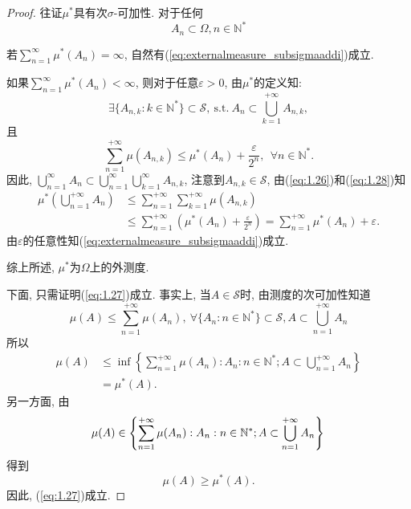 \begin{proof}
	往证$\mu^*$具有次$\sigma$-可加性. 对于任何\begin{equation}
		A_n\subset\Omega,n\in\mathbb{N}^*
	\end{equation}
	\begin{blist}
		\item 若$\sum_{n=1}^{\infty}\mu^*(A_n) = \infty$, 自然有(\ref{eq:externalmeasure_subsigmaaddi})成立.
		\item 如果$\sum_{n=1}^{\infty}\mu^*(A_n) < \infty$, 则对于任意$\varepsilon>0$, 由$\mu^*$的定义知:
		\begin{equation}
			\exists\{A_{n,k}:k\in\mathbb{N}^*\}\subset\mathscr{S},~\mathrm{s.t.}~A_n\subset\bigcup_{k=1}^{+\infty}A_{n,k},
		\end{equation}
		且\begin{equation}\label{eq:1.28}
			\sum_{n=1}^{+\infty}\mu(A_{n,k})\leqslant \mu^*(A_n) + \frac{\varepsilon}{2^n},~~\forall n\in\mathbb{N}^*.
		\end{equation}
		因此, $\bigcup_{n=1}^{\infty}A_n\subset\bigcup_{n=1}^{\infty}\bigcup_{k=1}^{\infty}A_{n,k}$, 注意到$A_{n,k}\in\mathscr{S}$, 由(\ref{eq:1.26})和(\ref{eq:1.28})知
		\begin{align}
			\mu^*\left( \bigcup_{n=1}^{+\infty}A_n \right)&\leqslant \sum_{n=1}^{+\infty}\sum_{k=1}^{+\infty}\mu(A_{n,k})\nonumber\\
			&\leqslant \sum_{n=1}^{+\infty}\left( \mu^*(A_n)+\frac{\varepsilon}{2^n} \right) = \sum_{n=1}^{+\infty}\mu^*(A_n)+\varepsilon.
		\end{align}
		由$\varepsilon$的任意性知(\ref{eq:externalmeasure_subsigmaaddi})成立.
	\end{blist}
	综上所述, $\mu^*$为$\Omega$上的外测度.

	下面, 只需证明(\ref{eq:1.27})成立. 事实上, 当$A\in\mathscr{S}$时, 由测度的次可加性知道
	\begin{equation}
		\mu(A)\leqslant \sum_{n=1}^{+\infty}\mu(A_n),~\forall \{A_n:n\in\mathbb{N}^*\}\subset\mathscr{S},A\subset\bigcup_{n=1}^{+\infty}A_n
	\end{equation}
	所以\begin{align}
		\mu(A) &\leqslant \inf\left\{ \sum_{n=1}^{+\infty}\mu(A_n):A_n:n\in\mathbb{N}^*; A\subset\bigcup_{n=1}^{+\infty}A_n \right\}\nonumber\\
		&=\mu^*(A).
	\end{align}
	另一方面, 由\begin{equation}
		\mu(A) \in \left\{ \sum_{n=1}^{+\infty}\mu(A_n):A_n:n\in\mathbb{N}^*; A\subset\bigcup_{n=1}^{+\infty}A_n \right\}\nonumber\\
	\end{equation}
	得到\begin{equation}
		\mu(A) \geqslant \mu^*(A).
	\end{equation}
	因此, (\ref{eq:1.27})成立.
\end{proof}

